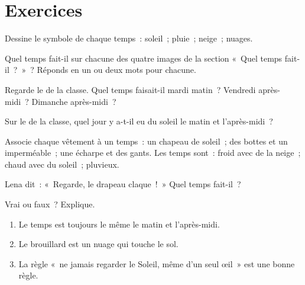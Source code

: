 \section{Exercices}

\begin{exercise}[$\star$]\label{exo:g1:watching-the-weather:1}
Dessine le symbole de chaque temps~: soleil~; pluie~; neige~; nuages.
\end{exercise}

\begin{exercise}[$\star$]\label{exo:g1:watching-the-weather:2}
Quel temps fait-il sur chacune des quatre images de la section
«~Quel temps fait-il~?~»~? Réponds en un ou deux mots pour chacune.
\end{exercise}

\begin{exercise}[$\star$]\label{exo:g1:watching-the-weather:3}
Regarde le  de la classe. Quel temps faisait-il mardi matin~?
Vendredi après-midi~? Dimanche après-midi~?
\end{exercise}

\begin{exercise}[$\star$]\label{exo:g1:watching-the-weather:4}
Sur le  de la classe, quel jour y a-t-il eu du soleil le matin
et l'après-midi~?
\end{exercise}

\begin{exercise}[$\star$]\label{exo:g1:watching-the-weather:5}
Associe chaque vêtement à un temps~: un chapeau de soleil~; des bottes et un
imperméable~; une écharpe et des gants. Les temps sont~: froid avec de la
neige~; chaud avec du soleil~; pluvieux.
\end{exercise}

\begin{exercise}[$\star$]\label{exo:g1:watching-the-weather:6}
Lena dit~: «~Regarde, le drapeau claque~!~» Quel temps fait-il~?
\end{exercise}

\begin{exercise}[$\star$]\label{exo:g1:watching-the-weather:7}
Vrai ou faux~? Explique.
\begin{enumerate}
  \item Le temps est toujours le même le matin et l'après-midi.
  \item Le brouillard est un nuage qui touche le sol.
  \item La règle «~ne jamais regarder le Soleil, même d'un seul œil~» est une bonne règle.
\end{enumerate}
\end{exercise}

